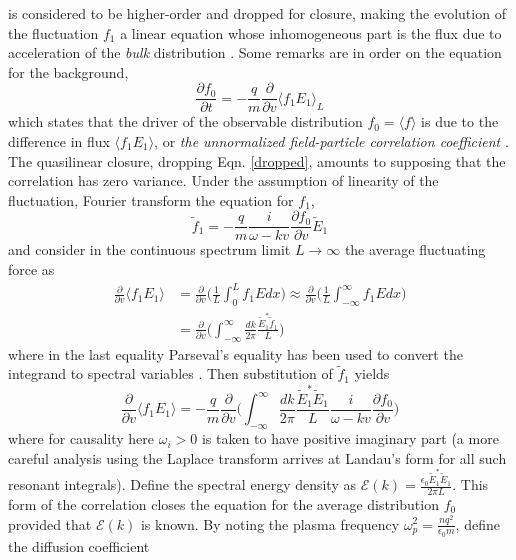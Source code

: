 \documentclass{article}
\begin{document}
is considered to be higher-order and dropped for closure, making the evolution of the fluctuation $f_1$ a linear equation whose inhomogeneous part is the flux due to acceleration of the \textit{bulk} distribution \cite{thorne}. Some remarks are in order on the equation for the background,
\begin{equation}
  \frac{\partial f_0}{\partial t} = -\frac{q}{m}\frac{\partial}{\partial v}\langle f_1E_1\rangle_L \label{background_eqn}
\end{equation}
which states that the driver of the observable distribution $f_0 = \langle f\rangle$ is due to the difference in flux $\langle f_1E_1\rangle$, or \textit{the unnormalized field-particle correlation coefficient} \cite{vankampen}. The quasilinear closure, dropping Eqn. \ref{dropped}, amounts to supposing that the correlation has zero variance. Under the assumption of linearity of the fluctuation, Fourier transform the equation for $f_1$,
\begin{equation}
  \widetilde{f}_1 = -\frac{q}{m}\frac{i}{\omega - kv}\frac{\partial f_0}{\partial v}\widetilde{E}_1
\end{equation}
and consider in the continuous spectrum limit $L\to\infty$ the average fluctuating force as
\begin{align}
  \frac{\partial }{\partial v}\Big\langle f_1E_1\Big\rangle &= \frac{\partial}{\partial v}\Big(\frac{1}{L}\int_0^Lf_1Edx\Big) \approx \frac{\partial}{\partial v}\Big(\frac{1}{L}\int_{-\infty}^\infty f_1Edx\Big)\\
  &= \frac{\partial}{\partial v}\Big(\int_{-\infty}^\infty\frac{dk}{2\pi}\frac{\widetilde{E}_1^*\widetilde{f}_1}{L}\Big)
\end{align}
where in the last equality Parseval's equality has been used to convert the integrand to spectral variables \cite{thorne}. Then substitution of $\widetilde{f}_1$ yields
\begin{equation}
  \frac{\partial }{\partial v}\Big\langle f_1E_1\Big\rangle = -\frac{q}{m}\frac{\partial}{\partial v}\Big(\int_{-\infty}^\infty\frac{dk}{2\pi}\frac{\widetilde{E}_1^*\widetilde{E}_1}{L}\frac{i}{\omega - kv}\frac{\partial f_0}{\partial v}\Big)\label{mean_fluc_accel}
\end{equation}
where for causality here $\omega_i > 0$ is taken to have positive imaginary part (a more careful analysis using the Laplace transform arrives at Landau's form for all such resonant integrals). Define the spectral energy density as $\mathcal{E}(k) = \frac{\epsilon_0\widetilde{E}_1^*\widetilde{E}_1}{2\pi L}$. This form of the correlation closes the equation for the average distribution $f_0$ provided that $\mathcal{E}(k)$ is known. By noting the plasma frequency $\omega_p^2 = \frac{nq^2}{\epsilon_0m}$, define the diffusion coefficient
\end{document}
